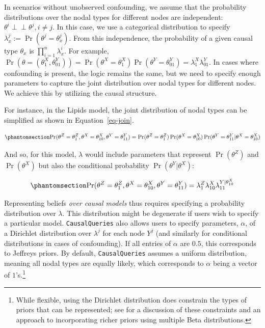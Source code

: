\documentclass[
  11pt,
  article]{jss}
\begin{document}
In scenarios without unobserved confounding, we assume that the
probability distributions over the nodal types for different nodes are
independent: \(\theta^i \perp\!\!\! \perp \theta^j, i\neq j\). In this
case, we use a categorical distribution to specify
\({\lambda^j_x} := \Pr(\theta^j = {\theta^j_x})\). From this
independence, the probability of a given causal type \(\theta_x\) is
\(\prod_{i=1}^n {\lambda^i_x}\). For example,
\(\Pr(\theta = (\theta^X_1, \theta^Y_{01})) = \Pr(\theta^X = \theta^X_1)\Pr(\theta^Y = \theta^Y_{01}) = \lambda^X_1\lambda^Y_{01}\).
In cases where confounding is present, the logic remains the same, but
we need to specify enough parameters to capture the joint distribution
over nodal types for different nodes. We achieve this by utilizing the
causal structure.

For instance, in the Lipids model, the joint distribution of nodal types
can be simplified as shown in Equation~\ref{eq-join}.

\begin{equation}\phantomsection\label{eq-join}{
\Pr(\theta^Z = \theta^Z_1, \theta^X = \theta^X_{10}, \theta^Y = \theta^Y_{11}) = 
\Pr(\theta^Z = \theta^Z_1)\Pr(\theta^X = \theta^X_{10})\Pr(\theta^Y = \theta^Y_{11}|\theta^X = \theta^X_{10})
}\end{equation}

And so, for this model, \(\lambda\) would include parameters that
represent \(\Pr(\theta^Z)\) and \(\Pr(\theta^X)\) but also the
conditional probability \(\Pr(\theta^Y|\theta^X)\):

\begin{equation}\phantomsection\label{eq-join2}{
\Pr(\theta^Z = \theta^Z_1, \theta^X = \theta^X_{10}, \theta^Y = \theta^Y_{11}) = 
\lambda^Z_1\lambda^X_{10}\lambda^{Y|\theta^X_{10}}_{11}
}\end{equation}

Representing beliefs \emph{over causal models} thus requires specifying
a probability distribution over \(\lambda\). This distribution might be
degenerate if users wish to specify a particular model.
\texttt{CausalQueries} also allows users to specify parameters,
\(\alpha\), of a Dirichlet distribution over \(\lambda^j\) for each node
\(Y^j\) (and similarly for conditional distributions in cases of
confounding). If all entries of \(\alpha\) are \(0.5\), this corresponds
to Jeffreys priors. By default, \texttt{CausalQueries} assumes a uniform
distribution, meaning all nodal types are equally likely, which
corresponds to \(\alpha\) being a vector of \(1\)'s.\footnote{While
  flexible, using the Dirichlet distribution does constrain the types of
  priors that can be represented; see \citet{irons2023causally} for a
  discussion of these constraints and an approach to incorporating
  richer priors using multiple Beta distributions.}
\end{document}
